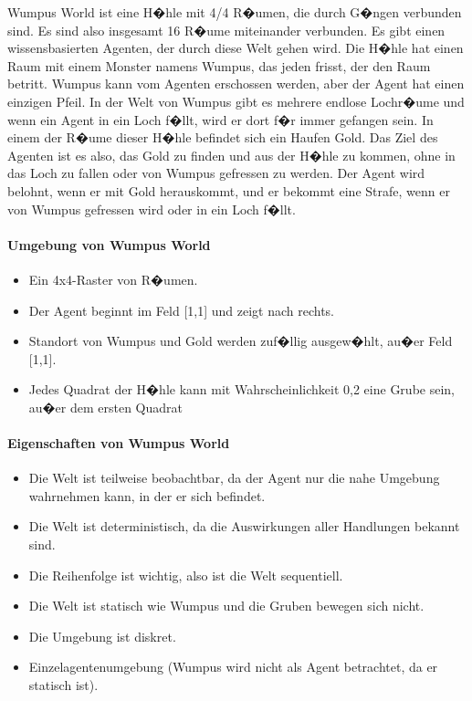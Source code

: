Wumpus World ist eine H�hle mit 4/4 R�umen, die durch G�ngen verbunden sind. Es sind also insgesamt 16 R�ume miteinander verbunden. Es gibt einen wissensbasierten Agenten, der durch diese Welt gehen wird. Die H�hle hat einen Raum mit einem Monster namens Wumpus, das jeden frisst, der den Raum betritt. Wumpus kann vom Agenten erschossen werden, aber der Agent hat einen einzigen Pfeil. In der Welt von Wumpus gibt es mehrere endlose Lochr�ume und wenn ein Agent in ein Loch f�llt, wird er dort f�r immer gefangen sein. In einem der R�ume dieser H�hle befindet sich ein Haufen Gold. Das Ziel des Agenten ist es also, das Gold zu finden und aus der H�hle zu kommen, ohne in das Loch zu fallen oder von Wumpus gefressen zu werden. Der Agent wird belohnt, wenn er mit Gold herauskommt, und er bekommt eine Strafe, wenn er von Wumpus gefressen wird oder in ein Loch f�llt.

\paragraph{Umgebung von Wumpus World}
\begin{itemize}
    \item Ein 4x4-Raster von R�umen.
    \item Der Agent beginnt im Feld [1,1] und zeigt nach rechts.
    \item Standort von Wumpus und Gold werden zuf�llig ausgew�hlt, au�er Feld [1,1].
    \item Jedes Quadrat der H�hle kann mit Wahrscheinlichkeit 0,2 eine Grube sein, au�er dem ersten Quadrat
\end{itemize}

\paragraph{Eigenschaften von Wumpus World}
\begin{itemize}
    \item Die Welt ist teilweise beobachtbar, da der Agent nur die nahe Umgebung wahrnehmen kann, in der er sich befindet.
    \item Die Welt ist deterministisch, da die Auswirkungen aller Handlungen bekannt sind.
    \item Die Reihenfolge ist wichtig, also ist die Welt sequentiell.
    \item Die Welt ist statisch wie Wumpus und die Gruben bewegen sich nicht.
    \item Die Umgebung ist diskret.
    \item Einzelagentenumgebung (Wumpus wird nicht als Agent betrachtet, da er statisch ist).
\end{itemize}

